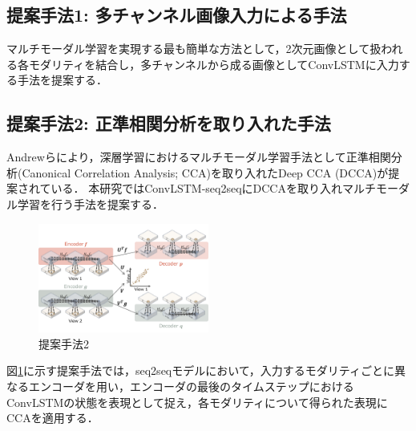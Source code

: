 \documentclass[a4j,twoside]{jarticle}
\begin{document}
\begin{論文概要}
\subsection{提案手法1: 多チャンネル画像入力による手法}
%
マルチモーダル学習を実現する最も簡単な方法として，2次元画像として扱われる各モダリティを結合し，多チャンネルから成る画像としてConvLSTMに入力する手法を提案する．
%
\subsection{提案手法2: 正準相関分析を取り入れた手法}
Andrewらにより，深層学習におけるマルチモーダル学習手法として正準相関分析(Canonical Correlation Analysis; CCA)を取り入れたDeep CCA (DCCA)が提案されている\cite{andrew2013deep}．
本研究ではConvLSTM-seq2seqにDCCAを取り入れマルチモーダル学習を行う手法を提案する．
\begin{figure}[b]
	\centering
	\includegraphics[width=5.6cm]{../images/3.The_Model/the_model_dcca_pretrain.pdf}
	\vspace{-0.28cm}
	\caption{提案手法2}
	\label{fig:the_model_dcca_pretrain}
\end{figure} 
図\ref{fig:the_model_dcca_pretrain}に示す提案手法では，seq2seqモデルにおいて，入力するモダリティごとに異なるエンコーダを用い，エンコーダの最後のタイムステップにおけるConvLSTMの状態を表現として捉え，各モダリティについて得られた表現にCCAを適用する．
%

\end{論文概要}
\end{document}
